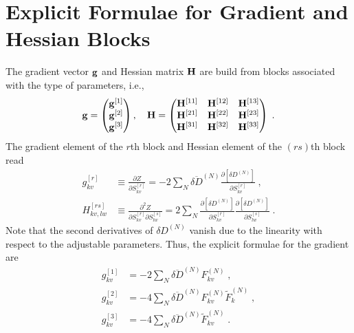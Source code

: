 \documentclass[aip,amsmath,amssymb,reprint,floatfix]{revtex4-1}
\begin{document}
\section{\label{a:blocks} Explicit Formulae for Gradient and Hessian Blocks}

The gradient vector ${\bf g}$ and Hessian matrix ${\bf H}$ 
are build from blocks associated with the type of parameters, i.e.,
%
\begin{equation}\label{e:Newton.gH}
 {\bf g} = 
\begin{pmatrix}
{\bf g}^{[1]} \\ 
{\bf g}^{[2]} \\ 
{\bf g}^{[3]}
\end{pmatrix} ,\quad
 {\bf H} = 
\begin{pmatrix}
{\bf H}^{[11]} & {\bf H}^{[12]} & {\bf H}^{[13]} \\ 
{\bf H}^{[21]} & {\bf H}^{[22]} & {\bf H}^{[23]} \\ 
{\bf H}^{[31]} & {\bf H}^{[32]} & {\bf H}^{[33]} 
\end{pmatrix} \;.
\end{equation}
%
The gradient element of the $r$th block and Hessian element of the $(rs)$th block read
%
\begin{subequations}
 \begin{align}
  g^{[r ]}_{kv}    &\equiv \frac{\partial   Z}{\partial S_{kv}^{[r]}} 
     =-2\sum_N \overline{\delta D}^{(N)}
               \frac{\partial   \left[ \delta D^{(N)} \right]}{\partial S_{kv}^{[r]}} \;,\\
  H^{[rs]}_{kv,lw} &\equiv \frac{\partial^2 Z}{\partial S_{kv}^{[r]} \partial S_{lw}^{[s]}}  
     = 2\sum_N 
        \frac{\partial   \left[ \delta D^{(N)} \right]}{\partial S_{kv}^{[r]}}
        \frac{\partial   \left[ \delta D^{(N)} \right]}{\partial S_{lw}^{[s]}} \;.
 \end{align}
\end{subequations}
%
Note that the second derivatives of $\delta D^{(N)}$ vanish
due to the linearity with respect to the adjustable parameters.
Thus, the explicit formulae for the gradient are
%
\begin{subequations}
 \begin{align}
  g^{[1]}_{kv} &=-2\sum_N \overline{\delta D}^{(N)} F^{(N)}_{kv} \;,\\
  g^{[2]}_{kv} &=-4\sum_N \overline{\delta D}^{(N)} F^{(N)}_{kv} \widetilde{F}^{(N)}_k \;,\\
  g^{[3]}_{kv} &=-4\sum_N \overline{\delta D}^{(N)} \widetilde{F}^{(N)}_{kv} \;.
 \end{align}
\end{subequations}
\end{document}

